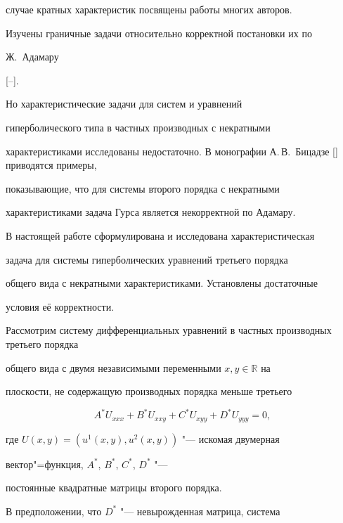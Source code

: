 случае кратных характеристик посвящены работы многих авторов.

Изучены граничные задачи относительно корректной постановки их по

Ж.~Адамару

[--].

Но характеристические задачи для систем и уравнений

гиперболического типа в частных производных с некратными

характеристиками исследованы недостаточно. В монографии А.\,В.~Бицадзе [] приводятся примеры,

показывающие, что для системы второго порядка с некратными

характеристиками задача Гурса является некорректной по Адамару.



В настоящей работе сформулирована и исследована характеристическая

задача для системы гиперболических уравнений третьего порядка

общего вида с некратными характеристиками. Установлены достаточные

условия её корректности.



\smallskip




Рассмотрим систему дифференциальных уравнений в частных производных третьего порядка

общего вида с двумя независимыми переменными $x,y\in\mathbb{R}$ на

плоскости, не содержащую производных порядка меньше третьего

\begin{equation}

A^{*}U_{xxx}+B^{*}U_{xxy}+C^{*}U_{xyy}+D^{*}U_{yyy}=0,\label{eq:kov:Yako1}

\end{equation}

где $U(x,y)=(u^{1}(x,y),u^{2}(x,y))$ "--- искомая двумерная

вектор"=функция,  $A^{*}$, $B^{*}$, $C^{*}$, $D^{*}$ "---

постоянные квадратные матрицы второго порядка.



В предположении, что $D^{*}$ "--- невырожденная матрица, система

